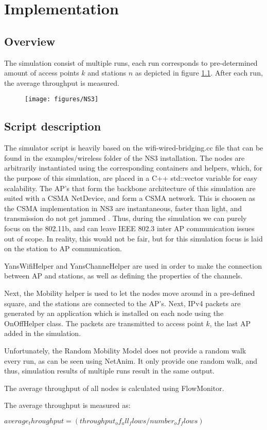 \chapter{Implementation}

\section{Overview} 
The simulation consist of multiple runs, each run corresponds to pre-determined amount of access points $k$ and stations $n$ as depicted in figure \ref{fig:NS3}. After each run, the average throughput is measured. 
 

\begin{figure}[h]
\centering
\texttt{[image: figures/NS3]}
\caption[Simulation setup]{}
\label{fig:NS3}
\end{figure}

\section{Script description} 
The simulator script is heavily based on the wifi-wired-bridging.cc file that can be found in the examples/wireless folder of the NS3 installation. The nodes are arbitrarily instantiated using the corresponding containers and helpers, which, for the purpose of this simulation, are placed in a C++ std::vector variable for easy scalability. The AP's that form the backbone architecture of this simulation are suited with a CSMA NetDevice, and form a CSMA network. This is choosen as the CSMA implementation in NS3 are instantaneous, faster than light, and transmission do not get jammed \cite{CSMADevices}. Thus, during the simulation we can purely focus on the 802.11b, and can leave IEEE 802.3 inter AP communication issues out of scope. In reality, this would not be fair, but for this simulation focus is laid on the station to AP communication. 

YansWifiHelper and YansChanneHelper are used in order to make the connection between AP and stations, as well as defining the properties of the channels.

Next, the Mobility helper is used to let the nodes move around in a pre-defined square, and the stations are connected to the AP's. Next, IPv4 packets are generated by an application which is installed on each node using the OnOffHelper class. The packets are transmitted to access point $k$, the last AP added in the simulation. 

Unfortunately, the Random Mobility Model does not provide a random walk every run, as can be seen using NetAnim. It only provide one random walk, and thus, simulation results of multiple runs result in the same output.

The average throughput of all nodes is calculated using FlowMonitor.  

The average throughput is measured as: 

$average_throughput = (throughput_of_all_flows / number_of_flows)$ 